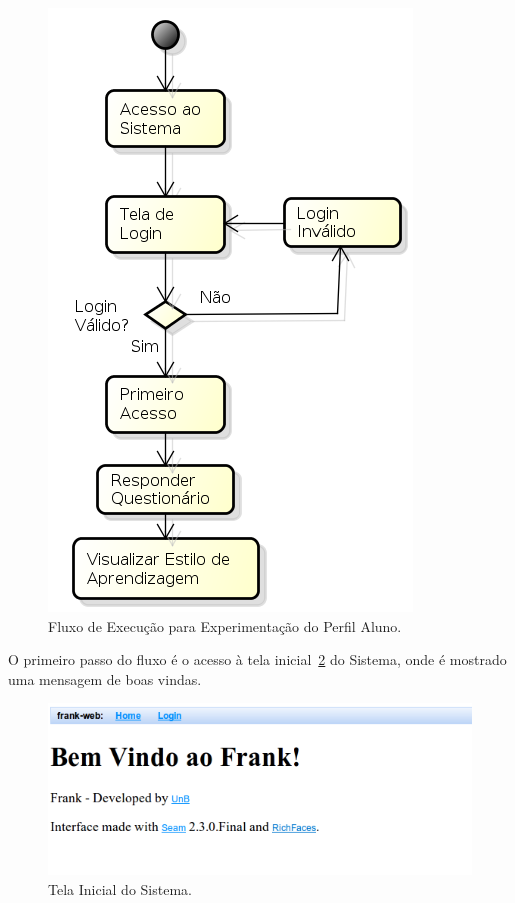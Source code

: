 \begin{figure}
	\centering
	\includegraphics[scale=0.6]{images/fluxo-aluno.png}
	\caption{Fluxo de Execução para Experimentação do Perfil Aluno.}
	\label{fig:fluxo-aluno}
\end{figure}

O primeiro passo do fluxo é o acesso à tela inicial~\ref{fig:frank-tela-aluno-inicial} do Sistema, onde é mostrado uma mensagem de boas vindas. 

\begin{figure}
	\centering
	\includegraphics[scale=0.6]{images/frank-tela-aluno-inicial.png}
	\caption{Tela Inicial do Sistema.}
	\label{fig:frank-tela-aluno-inicial}
\end{figure}

